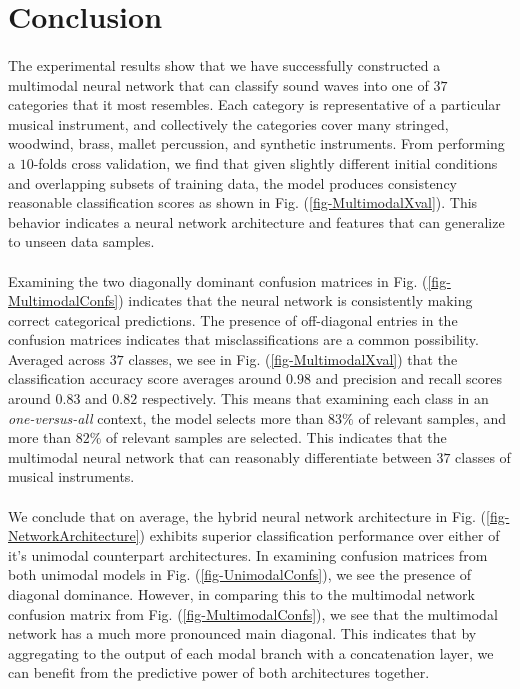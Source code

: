 \documentclass[12pt,letterpaper]{article}
\begin{document}

\newpage
\section{Conclusion}
\label{sec-Conclusion}

\paragraph*{}The experimental results show that we have successfully constructed a multimodal neural network that can classify sound waves into one of $37$ categories that it most resembles. Each category is representative of a particular musical instrument, and collectively the categories cover many stringed, woodwind, brass, mallet percussion, and synthetic instruments. From performing a $10$-folds cross validation, we find that given slightly different initial conditions and overlapping subsets of training data, the model produces consistency reasonable classification scores as shown in Fig. (\ref{fig-MultimodalXval}). This behavior indicates a neural network architecture and features that can generalize to unseen data samples.

\paragraph*{}Examining the two diagonally dominant confusion matrices in Fig. (\ref{fig-MultimodalConfs}) indicates that the neural network is consistently making correct categorical predictions. The presence of off-diagonal entries in the confusion matrices indicates that misclassifications are a common possibility. Averaged across $37$ classes, we see in Fig. (\ref{fig-MultimodalXval}) that the classification accuracy score averages around $0.98$ and precision and recall scores around $0.83$ and $0.82$ respectively. This means that examining each class in an \textit{one-versus-all} context, the model selects more than $83\%$ of relevant samples, and more than $82\%$ of relevant samples are selected. This indicates that the multimodal neural network that can reasonably differentiate between $37$ classes of musical instruments.

\paragraph*{}We conclude that on average, the hybrid neural network architecture in Fig. (\ref{fig-NetworkArchitecture}) exhibits superior classification performance over either of it's unimodal counterpart architectures. In examining confusion matrices from both unimodal models in Fig. (\ref{fig-UnimodalConfs}), we see the presence of diagonal dominance. However, in comparing this to the multimodal network confusion matrix from Fig. (\ref{fig-MultimodalConfs}), we see that the multimodal network has a much more pronounced main diagonal. This indicates that by aggregating to the output of each modal branch with a concatenation layer, we can benefit from the predictive power of both architectures together.
\end{document}
